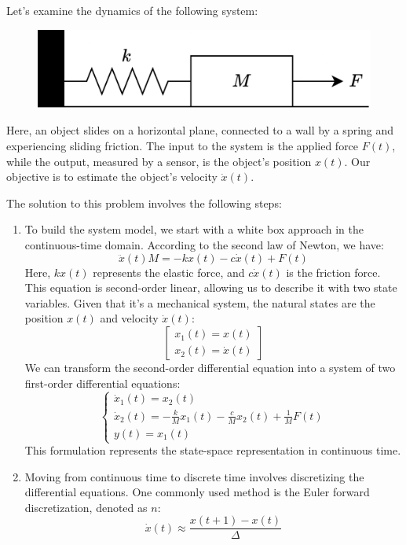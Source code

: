 \begin{example}
    Let's examine the dynamics of the following system:
    \begin{figure}[H]
        \centering
        \includegraphics[width=0.4\linewidth]{images/example.png}
    \end{figure}
    Here, an object slides on a horizontal plane, connected to a wall by a spring and experiencing sliding friction.
    The input to the system is the applied force $F(t)$, while the output, measured by a sensor, is the object's position $x(t)$. 
    Our objective is to estimate the object's velocity $\dot{x}(t)$. 

    The solution to this problem involves the following steps:
    \begin{enumerate}
        \item To build the system model, we start with a white box approach in the continuous-time domain. 
            According to the second law of Newton, we have:
            \[\ddot{x}(t)M=-kx(t)-c\dot{x}(t)+F(t)\]
            Here, $kx(t)$ represents the elastic force, and $c\dot{x}(t)$ is the friction force.
            This equation is second-order linear, allowing us to describe it with two state variables.
            Given that it's a mechanical system, the natural states are the position $x(t)$ and velocity $\dot{x}(t)$:
            \[\begin{bmatrix} x_1(t)=x(t) \\ x_2(t)=\dot{x}(t) \end{bmatrix}\]
            We can transform the second-order differential equation into a system of two first-order differential equations:
            \[\begin{cases}
                \dot{x}_1(t)=x_2(t) \\
                \dot{x}_2(t)=-\frac{k}{M}x_1(t)-\frac{c}{M}x_2(t)+\frac{1}{M}F(t) \\
                y(t)=x_1(t)
            \end{cases}\]
            This formulation represents the state-space representation in continuous time.
        \item Moving from continuous time to discrete time involves discretizing the differential equations. 
            One commonly used method is the Euler forward discretization, denoted as $n$: 
            \[\dot{x}(t)\approx\dfrac{x(t+1)-x(t)}{\Delta}\]

\end{enumerate}
\end{example}
